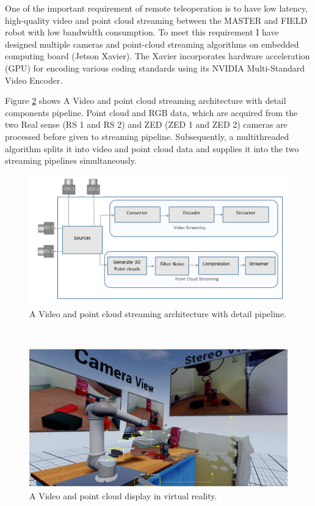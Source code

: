 One of the important requirement of remote teleoperation is to have low latency, high-quality video and point cloud streaming between the MASTER and FIELD robot with low bandwidth consumption. To meet this requirement I have designed multiple cameras and point-cloud streaming algorithms on embedded computing board (Jetson Xavier). The Xavier incorporates hardware acceleration (GPU) for encoding various coding standards using its NVIDIA Multi-Standard Video Encoder.

Figure \ref{fig:StreamingPipe} shows A Video and point cloud streaming architecture with detail components pipeline. Point cloud and RGB data, which are acquired from the two Real sense (RS 1 and RS 2) and ZED (ZED 1 and ZED 2) cameras are processed before given to streaming pipeline. Subsequently, a multithreaded algorithm splits it into video and point cloud data and supplies it into the two streaming pipelines simultaneously. 

\begin{figure}[h]
    \centering
    \includegraphics[scale=0.4]{images/Video_Point_Streaming.PNG}
    \caption{A Video and point cloud streaming architecture with detail pipeline.}
    \label{fig:StreamingPipe}
\end{figure}\\


\begin{figure}[h]
    \centering
    \includegraphics[scale=0.2]{images/Point_cloud_multipl_1.PNG}
    \caption{A Video and point cloud display in virtual reality.}
    \label{fig:StreamingPipe}
\end{figure}\\


